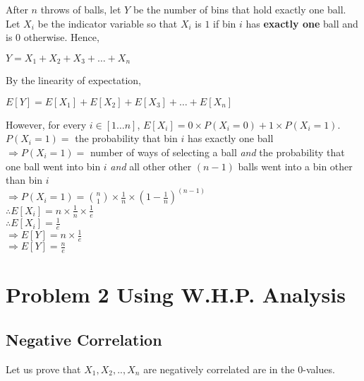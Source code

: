 \documentclass{article}
\begin{document}
After $n$ throws of balls, let $Y$ be the number of bins that hold
exactly one ball. Let $X_i$ be the indicator variable so that $X_i$ is
$1$ if bin $i$ has \textbf{exactly one} ball and is $0$
otherwise. Hence,

$Y = X_1 + X_2 + X_3 + \ldots{} + X_n$

By the linearity of expectation,

$E[Y] = E[X_1] + E[X_2] + E[X_3] + \ldots{} + E[X_n]$

However, for every $i \in [1\ldots{}n]$, $E[X_i] = 0 \times P(X_i = 0)
+ 1 \times P(X_i = 1)$.\\
$P(X_i = 1) = $ the probability that bin $i$ has exactly one ball\\
$\Rightarrow P(X_i = 1) = $ number of ways of selecting a ball \textit{and} the probability that one ball went into
bin $i$ \textit{and} all other other $(n-1)$ balls went into a bin other than
bin $i$\\
$\Rightarrow P(X_i = 1) = \binom{n}{1} \times \frac{1}{n} \times (1 - \frac{1}{n})^{(n-1)}$\\
$\therefore E[X_i] = n \times \frac{1}{n} \times \frac{1}{e}$\\
$\therefore E[X_i] = \frac{1}{e}$\\
$\Rightarrow E[Y] = n \times \frac{1}{e}$\\
$\Rightarrow E[Y] = \frac{n}{e}$

\clearpage

\section {Problem 2 Using W.H.P. Analysis}

\subsection{Negative Correlation}
Let us prove that $X_{1}, X_{2}, .., X_{n}$ are negatively correlated are in the 0-values.\\
\end{document}
